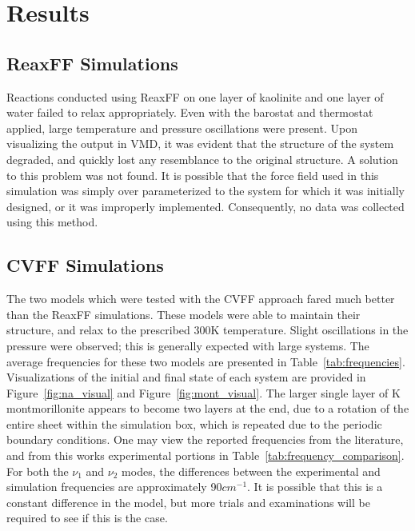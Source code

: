	\section{Results}
		\subsection{ReaxFF Simulations}
		Reactions conducted using ReaxFF on one layer of kaolinite and one layer of water failed to relax appropriately. Even with the barostat and thermostat applied, large temperature and pressure oscillations were present. Upon visualizing the output in VMD, it was evident that the structure of the system degraded, and quickly lost any resemblance to the original structure. A solution to this problem was not found. It is possible that the force field used in this simulation was simply over parameterized to the system for which it was initially designed, or it was improperly implemented. Consequently, no data was collected using this method.
		
		\subsection{CVFF Simulations}
		The two models which were tested with the CVFF approach fared much better than the ReaxFF simulations. These models were able to maintain their structure, and relax to the prescribed 300K temperature. Slight oscillations in the pressure were observed; this is generally expected with large systems. The average frequencies for these two models are presented in Table~\ref{tab:frequencies}. Visualizations of the initial and final state of each system are provided in Figure~\ref{fig:na_visual} and Figure~\ref{fig:mont_visual}. The larger single layer of K montmorillonite appears to become two layers at the end, due to a rotation of the entire sheet within the simulation box, which is repeated due to the periodic boundary conditions. One may view the reported frequencies from the literature, and from this works experimental portions in Table~\ref{tab:frequency_comparison}. For both the $\nu_1$ and $\nu_2$ modes, the differences between the experimental and simulation frequencies are approximately 90$cm^{-1}$. It is possible that this is a constant difference in the model, but more trials and examinations will be required to see if this is the case.

